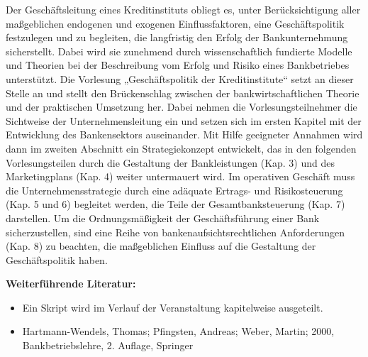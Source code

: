 \begin{course}
\begin{content}
Der Geschäftsleitung eines Kreditinstituts obliegt es, unter Berücksichtigung aller maßgeblichen endogenen und exogenen Einflussfaktoren, eine Geschäftspolitik festzulegen und zu begleiten, die langfristig den Erfolg der Bankunternehmung sicherstellt. Dabei wird sie zunehmend durch wissenschaftlich fundierte Modelle und Theorien bei der Beschreibung vom Erfolg und Risiko eines Bankbetriebes unterstützt. Die Vorlesung „Geschäftspolitik der Kreditinstitute“ setzt an dieser Stelle an und stellt den Brückenschlag zwischen der bankwirtschaftlichen Theorie und der praktischen Umsetzung her. Dabei nehmen die Vorlesungsteilnehmer die Sichtweise der Unternehmensleitung ein und setzen sich im ersten Kapitel mit der Entwicklung des Bankensektors auseinander. Mit Hilfe geeigneter Annahmen wird dann im zweiten Abschnitt ein Strategiekonzept entwickelt, das in den folgenden Vorlesungsteilen durch die Gestaltung der Bankleistungen (Kap. 3) und des Marketingplans (Kap. 4) weiter untermauert wird. Im operativen Geschäft muss die Unternehmensstrategie durch eine adäquate Ertrags- und Risikosteuerung (Kap. 5 und 6) begleitet werden, die Teile der Gesamtbanksteuerung (Kap. 7) darstellen. Um die Ordnungsmäßigkeit der Geschäftsführung einer Bank sicherzustellen, sind eine Reihe von bankenaufsichtsrechtlichen Anforderungen (Kap. 8) zu beachten, die maßgeblichen Einfluss auf die Gestaltung der Geschäftspolitik haben.


\end{content}



\begin{literature}\textbf{Weiterführende Literatur:}

 \begin{itemize}\item Ein Skript wird im Verlauf der Veranstaltung kapitelweise ausgeteilt.  \item Hartmann-Wendels, Thomas; Pfingsten, Andreas; Weber, Martin; 2000, Bankbetriebslehre, 2. Auflage, Springer  \end{itemize}\end{literature}



\end{course}